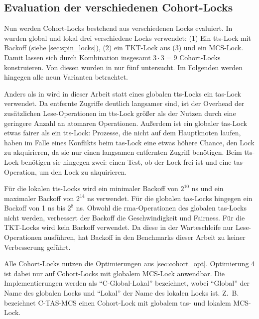 \subsection{Evaluation der verschiedenen Cohort-Locks}
\label{sec:cohort_baseline_evaluation}

Nun werden Cohort-Locks bestehend aus verschiedenen Locks evaluiert.
In \cite{Cohort-Lock} wurden global und lokal drei verschiedene Locks verwendet:
(1) Ein \gls{tts}-Lock mit Backoff (siehe \autoref{sec:spin_locks}),
(2) ein TKT-Lock aus \cite{TKT-Lock}
(3) und ein MCS-Lock.
Damit lassen sich durch Kombination insgesamt $3 \cdot 3 = 9$ Cohort-Locks konstruieren.
Von diesen wurden in \cite{Cohort-Lock} nur fünf untersucht.
Im Folgenden werden hingegen alle neun Varianten betrachtet.

Anders als in \cite{Cohort-Lock} wird in dieser Arbeit statt eines globalen \gls{tts}-Locks ein \gls{tas}-Lock verwendet.
Da entfernte Zugriffe deutlich langsamer sind,
ist der Overhead der zusätzlichen Lese-Operationen im \gls{tts}-Lock größer
als der Nutzen durch eine geringere Anzahl an atomaren Operationen.
Außerdem ist ein globaler \gls{tas}-Lock etwas fairer
als ein \gls{tts}-Lock:
Prozesse,
die nicht auf dem Hauptknoten laufen,
haben im Falle eines Konflikts beim \gls{tas}-Lock eine etwas höhere Chance,
den Lock zu akquirieren,
da sie nur einen langsamen entfernten Zugriff benötigen.
Beim \gls{tts}-Lock benötigen sie hingegen zwei:
einen Test, ob der Lock frei ist
und eine \gls{tas}-Operation,
um den Lock zu akquirieren.

Für die lokalen \gls{tts}-Locks wird ein minimaler Backoff von $2^{10}$ ns
und ein maximaler Backoff von $2^{14}$ ns verwendet.
Für die globalen \gls{tas}-Locks hingegen ein Backoff von 1 ns bis $2^8$ ns.
Obwohl die \gls{rma}-Operationen des globalen \gls{tas}-Locks nicht  werden,
verbessert der Backoff die Geschwindigkeit und Fairness.
Für die TKT-Locks wird kein Backoff verwendet.
Da diese in der Warteschleife nur Lese-Operationen ausführen,
hat Backoff in den Benchmarks dieser Arbeit zu keiner Verbesserung geführt.

Alle Cohort-Locks nutzen die Optimierungen aus \autoref{sec:cohort_opt}.
\hyperref[sec:cohort_opt_4]{Optimierung 4} ist dabei nur auf Cohort-Locks mit globalem MCS-Lock anwendbar.
Die Implementierungen werden als \enquote{C-Global-Lokal} bezeichnet,
wobei \enquote{Global} der Name des globalen Locks
und \enquote{Lokal} der Name des lokalen Locks ist.
Z.~B. bezeichnet C-TAS-MCS einen Cohort-Lock mit globalem \gls{tas}- und lokalem MCS-Lock.

